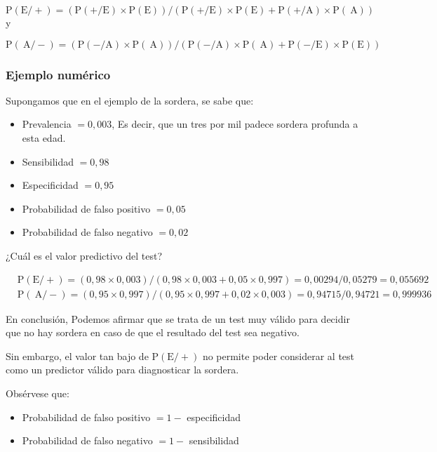 \documentclass[
]{article}
\begin{document}
\[
\mathrm{P}(\mathrm{E} /+)=(\mathrm{P}(+/ \mathrm{E}) \times \mathrm{P}(\mathrm{E})) /(\mathrm{P}(+/ \mathrm{E}) \times \mathrm{P}(\mathrm{E})+\mathrm{P}(+/ \mathrm{A}) \times \mathrm{P}(\mathrm{~A}))
\]
y

\[
\mathrm{P}(\mathrm{~A} /-)=(\mathrm{P}(-/ \mathrm{A}) \times \mathrm{P}(\mathrm{~A})) /(\mathrm{P}(-/ \mathrm{A}) \times \mathrm{P}(\mathrm{~A})+\mathrm{P}(-/ \mathrm{E}) \times \mathrm{P}(\mathrm{E}))
\]

\subsubsection{Ejemplo numérico}\label{ejemplo-numuxe9rico}

Supongamos que en el ejemplo de la sordera, se sabe que:

\begin{itemize}
\item
  Prevalencia \(=0,003\), Es decir, que un tres por mil padece sordera profunda a esta edad.
\item
  Sensibilidad \(=0,98\)
\item
  Especificidad \(=0,95\)
\item
  Probabilidad de falso positivo \(=0,05\)
\item
  Probabilidad de falso negativo \(=0,02\)
\end{itemize}

¿Cuál es el valor predictivo del test?

\[
\begin{aligned}
& \mathrm{P}(\mathrm{E} /+)=(0,98 \times 0,003) /(0,98 \times 0,003+0,05 \times 0,997)=0,00294 / 0,05279=0,055692 \\
& \mathrm{P}(\mathrm{~A} /-)=(0,95 \times 0,997) /(0,95 \times 0,997+0,02 \times 0,003)=0,94715 / 0,94721=0,999936
\end{aligned}
\]

En conclusión,
Podemos afirmar que se trata de un test muy válido para decidir que no hay sordera en caso de que el resultado del test sea negativo.

Sin embargo, el valor tan bajo de \(\mathrm{P}(\mathrm{E} /+)\) no permite poder considerar al test como un predictor válido para diagnosticar la sordera.

Obsérvese que:

\begin{itemize}
\item
  Probabilidad de falso positivo \(=1-\) especificidad
\item
  Probabilidad de falso negativo \(=1-\) sensibilidad
\end{itemize}
\end{document}
